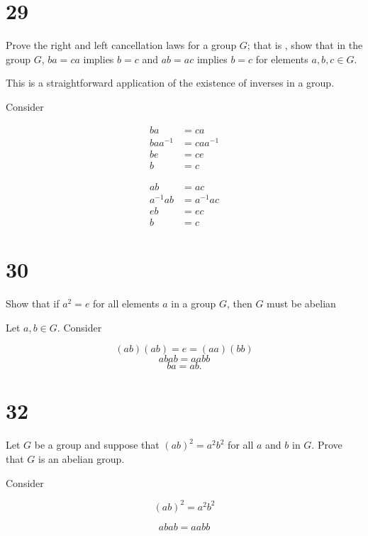\documentclass[a4paper]{article}
\begin{document}
\section*{29}

Prove the right and left cancellation laws for a group $G$; that is , show that in the group $G$, $ba = ca$ implies $b = c$ and $ab = ac$ implies $b = c$ for elements $a,b,c \in G$.

\vspace{\baselineskip}

This is a straightforward application of the existence of inverses in a  group.

Consider

\begin{align*}
ba &= ca \\
baa^{-1} &= caa^{-1} \\
be &= ce \\ 
b &= c
\end{align*}

\begin{align*}
ab &= ac \\
a^{-1}ab &= a^{-1}ac \\
eb &= ec \\
b &= c
\end{align*}


\section*{30}

Show that if $a^2 = e$ for all elements $a$ in a group $G$, then $G$ must be abelian

\vspace{\baselineskip}

Let $a,b \in G$. Consider

$$(ab)(ab) = e = (aa)(bb)$$
$$abab = aabb$$
$$ ba = ab.$$


\section*{32}

Let $G$ be a group and suppose that $(ab)^2 = a^2b^2$ for all $a$ and $b$ in $G$. Prove that $G$ is an abelian group.

\vspace{\baselineskip}

Consider

$$(ab)^2 = a^2b^2$$

$$abab = aa bb$$
\end{document}

